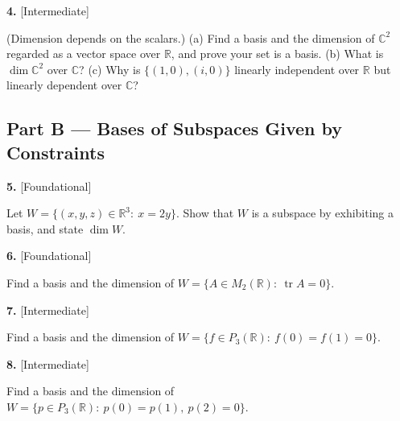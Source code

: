 \documentclass[11pt]{article}
\begin{document}
\begin{minipage}{\linewidth}\textbf{4.} \hfill{\scriptsize\color{ink}[Intermediate]}\par\nopagebreak (Dimension depends on the scalars.) (a) Find a basis and the dimension of $\mathbb{C}^{2}$ regarded as a vector space over $\mathbb{R}$, and prove your set is a basis. (b) What is $\dim\mathbb{C}^{2}$ over $\mathbb{C}$? (c) Why is $\{(1,0),(i,0)\}$ linearly independent over $\mathbb{R}$ but linearly dependent over $\mathbb{C}$?
\vspace{4.4cm}\end{minipage}\par\vspace{4pt}
\subsection*{\normalsize\color{ink} Part B --- Bases of Subspaces Given by Constraints}
\begin{minipage}{\linewidth}\textbf{5.} \hfill{\scriptsize\color{ink}[Foundational]}\par\nopagebreak Let $W=\{(x,y,z)\in\mathbb{R}^{3}:\ x=2y\}$. Show that $W$ is a subspace by exhibiting a basis, and state $\dim W$.
\vspace{3.3cm}\end{minipage}\par\vspace{4pt}
\begin{minipage}{\linewidth}\textbf{6.} \hfill{\scriptsize\color{ink}[Foundational]}\par\nopagebreak Find a basis and the dimension of $W=\{A\in M_2(\mathbb{R}):\ \operatorname{tr}A=0\}$.
\vspace{3.3cm}\end{minipage}\par\vspace{4pt}
\begin{minipage}{\linewidth}\textbf{7.} \hfill{\scriptsize\color{ink}[Intermediate]}\par\nopagebreak Find a basis and the dimension of $W=\{f\in P_3(\mathbb{R}):\ f(0)=f(1)=0\}$.
\vspace{4.1cm}\end{minipage}\par\vspace{4pt}
\begin{minipage}{\linewidth}\textbf{8.} \hfill{\scriptsize\color{ink}[Intermediate]}\par\nopagebreak Find a basis and the dimension of $W=\{p\in P_3(\mathbb{R}):\ p(0)=p(1),\ p(2)=0\}$.
\vspace{4.3cm}\end{minipage}\par\vspace{4pt}
\end{document}
